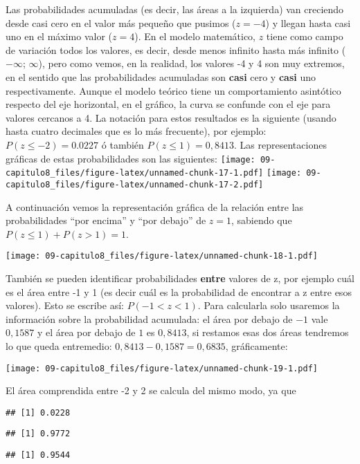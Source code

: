 \documentclass[]{article}
\begin{document}
Las probabilidades acumuladas (es decir, las áreas a la izquierda) van
creciendo desde casi cero en el valor más pequeño que pusimos
(\(z = -4\)) y llegan hasta casi uno en el máximo valor (\(z = 4\)). En
el modelo matemático, \(z\) tiene como campo de variación todos los
valores, es decir, desde menos infinito hasta más infinito (\(-\infty\);
\(\infty\)), pero como vemos, en la realidad, los valores -4 y 4 son muy
extremos, en el sentido que las probabilidades acumuladas son
\textbf{casi} cero y \textbf{casi} uno respectivamente. Aunque el modelo
teórico tiene un comportamiento asintótico respecto del eje horizontal,
en el gráfico, la curva se confunde con el eje para valores cercanos a
4. La notación para estos resultados es la siguiente (usando hasta
cuatro decimales que es lo más frecuente), por ejemplo:
\(P(z\leq-2)= 0.0227\) ó también \(P(z\leq1) = 0,8413\). Las
representaciones gráficas de estas probabilidades son las siguientes:
\texttt{[image: 09-capitulo8\_files/figure-latex/unnamed-chunk-17-1.pdf]}
\texttt{[image: 09-capitulo8\_files/figure-latex/unnamed-chunk-17-2.pdf]}

A continuación vemos la representación gráfica de la relación entre las
probabilidades ``por encima'' y ``por debajo'' de \(z=1\), sabiendo que
\(P(z\leq1)+P(z>1)=1\).

\texttt{[image: 09-capitulo8\_files/figure-latex/unnamed-chunk-18-1.pdf]}

También se pueden identificar probabilidades \textbf{entre} valores de
z, por ejemplo cuál es el área entre -1 y 1 (es decir cuál es la
probabilidad de encontrar a z entre esos valores). Esto se escribe así:
\(P(-1<z<1)\). Para calcularla solo usaremos la información sobre la
probabilidad acumulada: el área por debajo de \(-1\) vale \(0,1587\) y
el área por debajo de \(1\) es \(0,8413\), si restamos esas dos áreas
tendremos lo que queda entremedio: \(0,8413 - 0,1587 = 0,6835\),
gráficamente:

\texttt{[image: 09-capitulo8\_files/figure-latex/unnamed-chunk-19-1.pdf]}

El área comprendida entre -2 y 2 se calcula del mismo modo, ya que

\begin{verbatim}
## [1] 0.0228
\end{verbatim}

\begin{verbatim}
## [1] 0.9772
\end{verbatim}

\begin{verbatim}
## [1] 0.9544
\end{verbatim}
\end{document}
